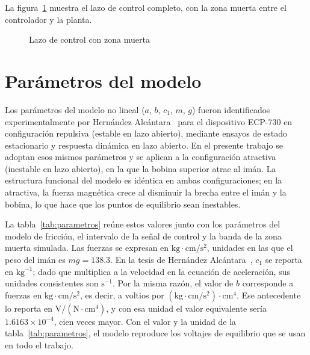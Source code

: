 La figura~\ref{lazo_de_control_con_zm} muestra el lazo de control completo, con la zona muerta entre el controlador y la planta.

\begin{figure}[ht]
    \centering
    
    \caption{Lazo de control con zona muerta}
    \label{lazo_de_control_con_zm}
\end{figure}

\section{Parámetros del modelo}\label{sec:parametros}

Los parámetros del modelo no lineal ($a$, $b$, $c_1$, $m$, $g$) fueron identificados experimentalmente por Hernández Alcántara~\cite{diana_tesis} para el dispositivo ECP-730 en configuración repulsiva (estable en lazo abierto), mediante ensayos de estado estacionario y respuesta dinámica en lazo abierto. En el presente trabajo se adoptan esos mismos parámetros y se aplican a la configuración atractiva (inestable en lazo abierto), en la que la bobina superior atrae al imán. La estructura funcional del modelo es idéntica en ambas configuraciones; en la atractiva, la fuerza magnética crece al disminuir la brecha entre el imán y la bobina, lo que hace que los puntos de equilibrio sean inestables.

La tabla~\ref{tab:parametros} reúne estos valores junto con los parámetros del modelo de fricción, el intervalo de la señal de control y la banda de la zona muerta simulada. Las fuerzas se expresan en $\text{kg}\cdot\text{cm}/\text{s}^2$, unidades en las que el peso del imán es $mg = 138.3$. En la tesis de Hernández Alcántara~\cite{diana_tesis}, $c_1$ se reporta en $\text{kg}^{-1}$; dado que multiplica a la velocidad en la ecuación de aceleración, sus unidades consistentes son $\text{s}^{-1}$. Por la misma razón, el valor de $b$ corresponde a fuerzas en $\text{kg}\cdot\text{cm}/\text{s}^2$, es decir, a voltios por $(\text{kg}\cdot\text{cm}/\text{s}^2)\cdot\text{cm}^4$. Ese antecedente lo reporta en $\text{V}/(\text{N}\cdot\text{cm}^4)$, y con esa unidad el valor equivalente sería $1.6163\times10^{-4}$, cien veces mayor. Con el valor y la unidad de la tabla~\ref{tab:parametros}, el modelo reproduce los voltajes de equilibrio que se usan en todo el trabajo.



